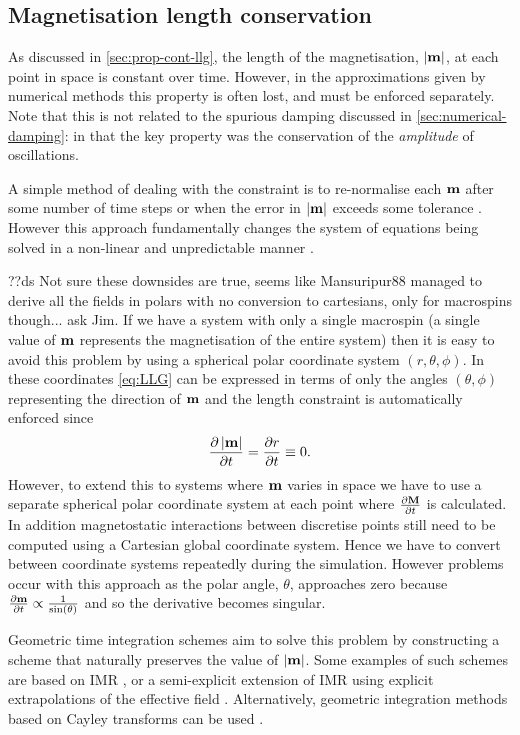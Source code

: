 \subsection{Magnetisation length conservation}
\label{sec:ensuring-constant-mv}

As discussed in \cref{sec:prop-cont-llg}, the length of the magnetisation, $\left|{\mathbf{m}} \right|$, at each point in space is constant over time.
However, in the approximations given by numerical methods this property is often lost, and must be enforced separately.
Note that this is not related to the spurious damping discussed in \cref{sec:numerical-damping}: in that  the key property was the conservation of the \emph{amplitude} of oscillations.

A simple method of dealing with the constraint is to re-normalise each $\mathbf{m}$ after some number of time steps or when the error in $\left|{\mathbf{m}} \right|$ exceeds some tolerance \cite{Fidler2000}.
However this approach fundamentally changes the system of equations being solved in a non-linear and unpredictable manner \cite{Lewis2003}.

??ds Not sure these downsides are true, seems like Mansuripur88 managed to derive all the fields in polars with no conversion to cartesians, only for macrospins though... ask Jim.
If we have a system with only a single macrospin (\ie a single value of $\mathbf{m}$ represents the magnetisation of the entire system) then it is easy to avoid this problem by using a spherical polar coordinate system $(r,\theta,\phi)$.
In these coordinates \cref{eq:LLG} can be expressed in terms of only the angles $(\theta,\phi)$ representing the direction of $\mathbf{m}$ and the length constraint is automatically enforced since
\begin{equation}
  \label{eq:40}
  \frac{\partial \left|{\mathbf{m}} \right|}{\partial t} = \frac{\partial r}{\partial t} \equiv 0.
\end{equation}
However, to extend this to systems where $\mathbf{m}$ varies in space we have to use a separate spherical polar coordinate system at each point where $\frac{\partial \mathbf{M}}{\partial t}$ is calculated.
In addition magnetostatic interactions between discretise points still need to be computed using a Cartesian global coordinate system.
Hence we have to convert between coordinate systems repeatedly during the simulation.
However problems occur with this approach as the polar angle, $\theta$, approaches zero because $\frac{\partial \mathbf{m}}{\partial t} \propto \frac{1}{\sin(\theta)}$ \cite{Fukushima2005} and so the derivative becomes singular.

Geometric time integration schemes aim to solve this problem by constructing a scheme that naturally preserves the value of $\left|{\mathbf{m}} \right|$.
Some examples of such schemes are based on IMR \cite{DAquino2005}, or a semi-explicit extension of IMR using explicit extrapolations of the effective field \cite{Spargo2003} \cite{Serpico2001}.
Alternatively, geometric integration methods based on Cayley transforms can be used \cite{Lewis2003} \cite{Bottauscio2011}.

